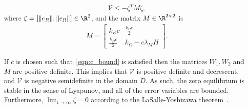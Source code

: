 \begin{gather*}
	\dot{\mathcal{V}} \leq -\zeta^T M \zeta ,
\end{gather*}
where $\zeta=[\|e_R\|,\|e_\Omega\|]\in\R^2$, and the matrix \( M \in \R^{2 \times 2} \) is 
\begin{gather*}
	M = \begin{bmatrix}
		k_R c & \frac{k_\Omega c}{2} \\
		\frac{k_\Omega c}{2} & k_\Omega - c \lambda_M H
	\end{bmatrix} .
\end{gather*}

If \( c \) is chosen such that~\cref{eqn:c_bound} is satisfied then the matrices \( W_1, W_2 \) and \( M \) are positive definite.
This implies that $\mathcal{V}$ is positive definite and decrescent, and $\dot{\mathcal{V}}$ is negative semidefinite in the domain $D$. As such, the zero equilibrium is stable in the sense of Lyapunov, and all of the error variables are bounded. Furthermore, $\lim_{t\to\infty} \zeta=0$ according to the LaSalle-Yoshizawa theorem~\cite{khalil1996}. 

%	
%	

